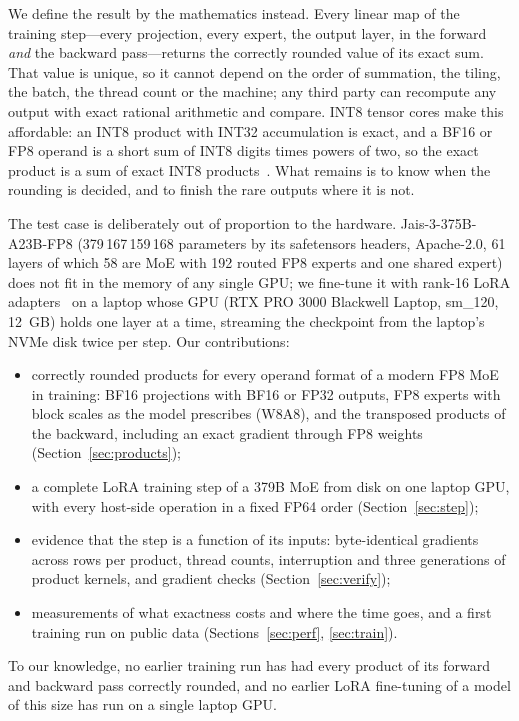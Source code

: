 \documentclass[11pt]{article}
\begin{document}
We define the result by the mathematics instead. Every linear map of the training step---every projection, every expert, the
output layer, in the forward \emph{and} the backward pass---returns the correctly rounded value of its exact sum. That value is
unique, so it cannot depend on the order of summation, the tiling, the batch, the thread count or the machine; any third party
can recompute any output with exact rational arithmetic and compare. INT8 tensor cores make this affordable: an INT8 product
with INT32 accumulation is exact, and a BF16 or FP8 operand is a short sum of INT8 digits times powers of two, so the exact
product is a sum of exact INT8 products~\cite{ozaki2,companion}. What remains is to know when the rounding is decided, and to
finish the rare outputs where it is not.

The test case is deliberately out of proportion to the hardware. Jais-3-375B-A23B-FP8 (379\,167\,159\,168 parameters by its
safetensors headers, Apache-2.0, 61 layers of which 58 are MoE with 192 routed FP8 experts and one shared expert) does not fit
in the memory of any single GPU; we fine-tune it with rank-16 LoRA adapters~\cite{hu21} on a laptop whose GPU (RTX PRO 3000
Blackwell Laptop, sm\_120, 12~GB) holds one layer at a time, streaming the checkpoint from the laptop's NVMe disk twice per
step. Our contributions:
\begin{itemize}
\item correctly rounded products for every operand format of a modern FP8 MoE in training: BF16 projections with BF16 or FP32
outputs, FP8 experts with block scales as the model prescribes (W8A8), and the transposed products of the backward, including
an exact gradient through FP8 weights (Section~\ref{sec:products});
\item a complete LoRA training step of a 379B MoE from disk on one laptop GPU, with every host-side operation in a fixed FP64
order (Section~\ref{sec:step});
\item evidence that the step is a function of its inputs: byte-identical gradients across rows per product, thread counts,
interruption and three generations of product kernels, and gradient checks (Section~\ref{sec:verify});
\item measurements of what exactness costs and where the time goes, and a first training run on public data
(Sections~\ref{sec:perf}, \ref{sec:train}).
\end{itemize}
To our knowledge, no earlier training run has had every product of its forward and backward pass correctly rounded, and no
earlier LoRA fine-tuning of a model of this size has run on a single laptop GPU.
\end{document}
